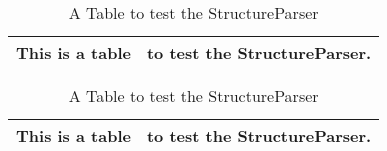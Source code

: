 \begin{table}
	\begin{center}\footnotesize
		\begin{tabular}{||c|c||}
			\hline
			This is a table & to test the StructureParser.\\
			\hline
			
			\hline
		\end{tabular}
	\end{center}
	\caption{A Table to test the StructureParser}
\end{table}

\begin{table}
	\begin{center}\footnotesize
		\begin{tabular}{||c|c||}
			\hline
			This is a table & to test the StructureParser.\\
			\hline
			
			\hline
		\end{tabular}
	\end{center}
	\caption{A Table to test the StructureParser}
\end{table}

\clearpage
